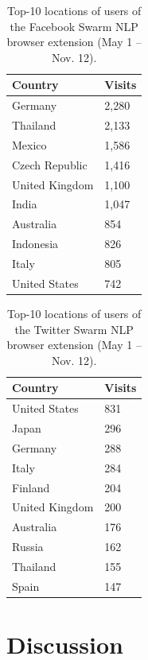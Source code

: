 \documentclass{iosart2c}
\begin{document}
\begin{table}
\begin{center}
    \begin{tabular}{ | l | l |}
    \hline
	\textbf{Country} & \textbf{Visits} \\ \hline
	Germany	& 2,280 \\ \hline
	Thailand & 2,133 \\ \hline
	Mexico & 1,586 \\ \hline
	Czech Republic & 1,416 \\ \hline
	United Kingdom & 1,100 \\ \hline
	India & 1,047 \\ \hline
	Australia & 854 \\ \hline
	Indonesia	& 826 \\ \hline
	Italy & 805 \\ \hline
	United States & 742 \\
    \hline
    \end{tabular}
\end{center}
\caption{Top-10 locations of users of the Facebook Swarm NLP browser extension (May 1 -- Nov. 12).}
\label{tab:facebooklocations}        
\end{table}

\begin{table}
\begin{center}
    \begin{tabular}{ | l | l |}
    \hline
	\textbf{Country} & \textbf{Visits} \\ \hline
	United States & 831 \\ \hline
	Japan & 296 \\ \hline
	Germany & 288 \\ \hline
	Italy & 284 \\ \hline
	Finland & 204 \\ \hline
	United Kingdom & 200 \\ \hline
	Australia & 176 \\ \hline
	Russia & 162 \\ \hline
	Thailand & 155 \\ \hline
	Spain & 147 \\
    \hline
    \end{tabular}
\end{center}
\caption{Top-10 locations of users of the Twitter Swarm NLP browser extension (May 1 -- Nov. 12).}
\label{tab:twitterlocations}        
\end{table}

\section{Discussion}
\end{document}
